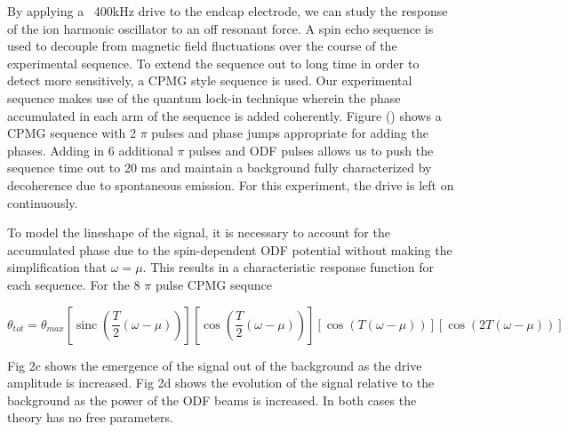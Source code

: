 \documentclass[aps,prl,twocolumn,groupedaddress]{revtex4-1}
\DeclareMathOperator{\sinc}{sinc}
\begin{document}
By applying a ~400kHz drive to the endcap electrode, we can study the response of the ion harmonic oscillator to an off resonant force. A spin echo sequence is used to decouple from magnetic field fluctuations over the course of the experimental sequence. To extend the sequence out to long time in order to detect more sensitively, a CPMG style sequence is used. Our experimental sequence makes use of the quantum lock-in technique wherein the phase accumulated in each arm of the sequence is added coherently. Figure () shows a CPMG sequence with 2 $\pi$ pulses and phase jumps appropriate for adding the phases. Adding in 6 additional $\pi$ pulses and ODF pulses allows us to push the sequence time out to 20 ms and maintain a background fully characterized by decoherence due to spontaneous emission. For this experiment, the drive is left on continuously.

To model the lineshape of the signal, it is necessary to account for the accumulated phase due to the spin-dependent ODF potential without making the simplification that $ \omega = \mu $. This results in a characteristic response function for each sequence. For the 8 $\pi$ pulse CPMG sequnce

\begin{widetext}
\begin{equation}
\theta_{tot} = \theta_{max} \left[ \sinc \left( \frac{T}{2} \left( \omega-\mu \right) \right) \right] 
\left[ \cos \left( \frac{T}{2} \left( \omega - \mu \right) \right) \right] \left[ \cos(T(\omega - \mu)) \right] \left[ \cos(2T(\omega - \mu)) \right] 
\end{equation}
\end{widetext}
Fig 2c shows the emergence of the signal out of the background as the drive amplitude is increased. Fig 2d shows the evolution of the signal relative to the background as the power of the ODF beams is increased. In both cases the theory has no free parameters.
\end{document}
